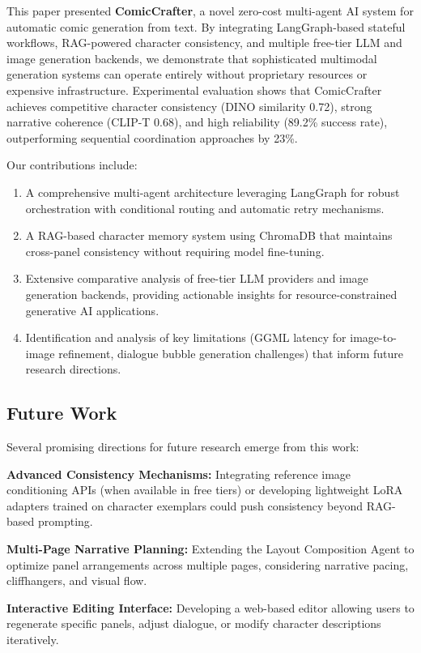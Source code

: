 \documentclass[runningheads]{llncs}
\begin{document}
This paper presented \textbf{ComicCrafter}, a novel zero-cost multi-agent AI system for automatic comic generation from text. By integrating LangGraph-based stateful workflows, RAG-powered character consistency, and multiple free-tier LLM and image generation backends, we demonstrate that sophisticated multimodal generation systems can operate entirely without proprietary resources or expensive infrastructure. Experimental evaluation shows that ComicCrafter achieves competitive character consistency (DINO similarity 0.72), strong narrative coherence (CLIP-T 0.68), and high reliability (89.2\% success rate), outperforming sequential coordination approaches by 23\%.

Our contributions include:
\begin{enumerate}
\item A comprehensive multi-agent architecture leveraging LangGraph for robust orchestration with conditional routing and automatic retry mechanisms.
\item A RAG-based character memory system using ChromaDB that maintains cross-panel consistency without requiring model fine-tuning.
\item Extensive comparative analysis of free-tier LLM providers and image generation backends, providing actionable insights for resource-constrained generative AI applications.
\item Identification and analysis of key limitations (GGML latency for image-to-image refinement, dialogue bubble generation challenges) that inform future research directions.
\end{enumerate}

\subsection{Future Work}

Several promising directions for future research emerge from this work:

\textbf{Advanced Consistency Mechanisms:} Integrating reference image conditioning APIs (when available in free tiers) or developing lightweight LoRA adapters trained on character exemplars could push consistency beyond RAG-based prompting.

\textbf{Multi-Page Narrative Planning:} Extending the Layout Composition Agent to optimize panel arrangements across multiple pages, considering narrative pacing, cliffhangers, and visual flow.

\textbf{Interactive Editing Interface:} Developing a web-based editor allowing users to regenerate specific panels, adjust dialogue, or modify character descriptions iteratively.
\end{document}
